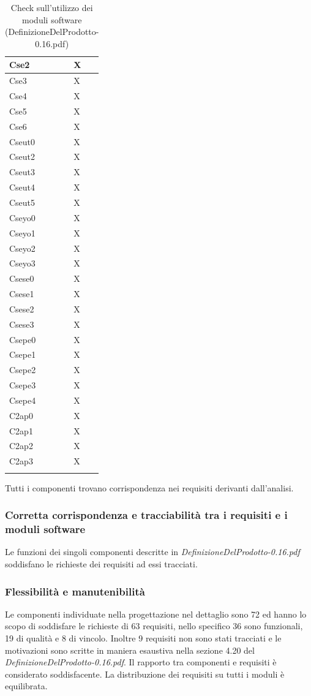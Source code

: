 \begin{footnotesize}
\begin{longtable}{|p{}|p{}|}
Cse2 &X\\\hline 
Cse3 &X\\\hline 
Cse4 &X\\\hline 
Cse5 &X\\\hline 
Cse6 &X\\\hline 
Cseut0 &X\\\hline 
Cseut2 &X\\\hline 
Cseut3 &X\\\hline  
Cseut4 &X\\\hline
Cseut5 &X\\\hline
Cseyo0 &X\\\hline
Cseyo1 &X\\\hline
Cseyo2 &X\\\hline
Cseyo3 &X\\\hline
Csese0 &X\\\hline 
Csese1 &X\\\hline 
Csese2 &X\\\hline 
Csese3 &X\\\hline 
Csepe0 &X\\\hline 
Csepe1 &X\\\hline 
Csepe2 &X\\\hline 
Csepe3 &X\\\hline 
Csepe4 &X\\\hline 
C2ap0 &X\\\hline
C2ap1 &X\\\hline
C2ap2 &X\\\hline
C2ap3 &X\\\hline

\caption{Check sull'utilizzo dei moduli software
(DefinizioneDelProdotto-0.16.pdf)}
\end{longtable}
\end{footnotesize}

Tutti i componenti trovano corrispondenza nei requisiti derivanti dall'analisi.

\subsubsection*{Corretta corrispondenza e tracciabilit\`a tra i requisiti e i
moduli software} 
Le funzioni dei singoli componenti descritte in
\emph{DefinizioneDelProdotto-0.16.pdf} soddisfano le richieste dei requisiti ad
essi tracciati.

\subsubsection*{Flessibilit\`a e manutenibilit\`a}
Le componenti individuate nella progettazione nel dettaglio sono 72 ed
hanno lo scopo di soddisfare le richieste di 63 requisiti, nello specifico 36
sono funzionali, 19 di qualit\`a e 8 di vincolo. Inoltre 9 requisiti non sono
stati tracciati e le motivazioni sono scritte in maniera esaustiva nella sezione
4.20 del \emph{DefinizioneDelProdotto-0.16.pdf}. Il rapporto tra componenti e
requisiti \`e considerato soddisfacente. La distribuzione dei
requisiti su tutti i moduli \`e equilibrata.


